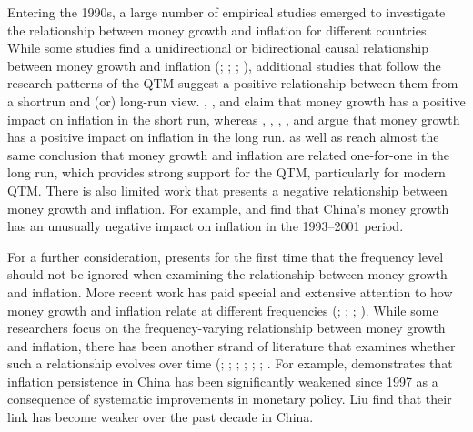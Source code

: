 \documentclass[a4paper,fleqn]{cas-sc}
\begin{document}
Entering the 1990s, a large number of empirical studies emerged to investigate the relationship between money growth and inflation for different countries. While some studies find a unidirectional or bidirectional causal relationship between money growth and inflation (\citealp*{ASSENMACHER2008}; \citealp*{HALL2009}; \citealp*{hossain2005}; \citealp*{liu2002}), additional studies that follow the research patterns of the QTM suggest a positive relationship between them from a shortrun and (or) long-run view. \cite{xie2004}, \cite{roffia2007}, \cite*{Zhang2012} and \cite*{Yu2012} claim that money growth has a positive impact on inflation in the short run, whereas \cite*{mccandless}, \cite{crowder1998}, \cite{christensen}, \cite{Grauwe2005}, and \cite{Zhang2008,zhang2009,Zhang2012,Yu2012} argue that money growth has a positive impact on inflation in the long run. \cite*{MacCandless1995} as well as \cite{Grauwe2005} reach almost the same conclusion that money growth and inflation are related one-for-one in the long run, which provides strong support for the QTM, particularly for modern QTM. There is also limited work that presents a negative relationship between money growth and inflation. For example, \cite{shuai2002} and \cite{wu2002} find that China's money growth has an unusually negative impact on inflation in the 1993–2001 period. 

For a further consideration, \cite{lucas1980} presents for the first time that the frequency level should not be ignored when examining the relationship between money growth and inflation. More recent work has paid special and extensive attention to how money growth and inflation relate at different frequencies (\citealp*{ASSENMACHER2008b,ASSENMACHER2008a}; \citealp*{benati2009}; \citealp*{bruggeman2005}; \citealp*{haug1880}). While some researchers focus on the frequency-varying relationship between money growth and inflation, there has been another strand of literature that examines whether such a relationship evolves over time (\citealp*{BASCO2009}; \citealp*{Christiano2003}; \citealp*{liu2012}; \citealp*{milas2009}; \citealp*{rolnick1997}; \citealp{sargent2008}; \citealp{zhang2009}. For example, \cite{zhang2009} demonstrates that inflation persistence in China has been significantly weakened since 1997 as a consequence of systematic improvements in monetary policy. \cite{liu2012} Liu find that their link has become weaker over the past decade in China.
\end{document}
